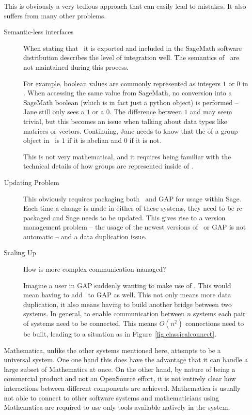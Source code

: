 This is obviously a very tedious approach that can easily lead to mistakes. 
It also suffers from many other problems. 
\begin{description}
  \item[Semantic-less interfaces]
  When stating that \lmfdb\ it is exported and included in the SageMath software distribution describes the level of integration well. 
  The semantics of \lmfdb\ are not maintained during this process. 
  
  For example, boolean values are commonly represented as integers $1$ or $0$ in \lmfdb. 
  When accessing the same value from SageMath, no conversion into a SageMath boolean (which is in fact just a python object) is performed -- Jane still only sees a $1$ or a $0$. 
  The difference between $1$ and  may seem trivial, but this becomes an issue when talking about data types like matrices or vectors. 
  Continuing, Jane needs to know that the  of a group object in \lmfdb\ is $1$ if it is abelian and $0$ if it is not. 
  
  This is not very mathematical, and it requires being familiar with the technical details of how groups are represented inside of \lmfdb. 

  \item[Updating Problem]
  This obviously requires packaging both \lmfdb\ and GAP for usage within Sage. 
  Each time a change is made in either of these systems, they need to be re-packaged and Sage needs to be updated. 
  This gives rise to a version management problem -- the usage of the newest versions of \lmfdb\ or GAP is not automatic --
  and a data duplication issue. 

  \item[Scaling Up]
  How is more complex communication managed?
  
  Imagine a user in GAP suddenly wanting to make use of \lmfdb. 
  This would mean having to add \lmfdb\ to GAP as well. 
  This not only means more data duplication, it also means having to build another bridge between two systems. 
  In general, to enable communication between $n$ systems each pair of systems need to be connected. 
  This means $O(n^2)$ connections need to be built, leading to a situation as in Figure~\ref{fig:classicalconnect}. 
\end{description}

Mathematica, unlike the other systems mentioned here, attempts to be a universal system. 
One one hand this does have the advantage that it can handle a large subset of Mathematics at once. 
On the other hand, by nature of being a commercial product and not an OpenSource effort, it is not entirely clear how interactions between different components are achieved. 
Mathematica is usually not able to connect to other software systems and mathematicians using Mathematica are required to use only tools available natively in the system. 

